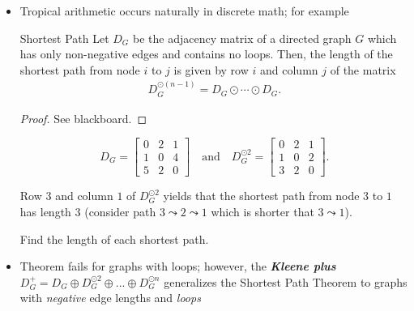 \documentclass{article}
\begin{document}
\begin{itemize}
	 \item Tropical arithmetic occurs naturally in discrete math; for example

		\begin{theorem*}{Shortest Path \cite[Prop. 7.9]{inv2nonlinearalgebra}}{}
			Let \( D_G  \) be the adjacency matrix of a directed graph \( G \) which has only non-negative edges and contains no loops.
			Then, the length of the shortest path from node \( i \) to \( j \) is given by row \( i \) and column \( j \) of the matrix 
			\begin{align*}
				D_G^{\odot(n-1)} = D_G \odot \cdots \odot D_G.
			\end{align*}
		\end{theorem*}

		\begin{proof}
			See blackboard.
		\end{proof}
		
		\begin{example*}{}{}
			\begin{figure}[H]
				\centering
				
			\end{figure}
			$$
				D_G = \begin{bmatrix}
					0 & 2 & 1 \\
					1 & 0 & 4 \\
					5 & 2 & 0
				\end{bmatrix} \quad \text{and} \quad D_G^{\odot 2} = \begin{bmatrix}
					0 & 2 &1 \\ 1 & 0 & 2 \\ 3 & 2 & 0
				\end{bmatrix}.
			$$

			Row \( 3 \) and column \( 1 \) of \(  D_G^{\odot 2} \) yields that the shortest path from node \( 3 \) to \( 1 \) has length \( 3 \) (consider path \( 3 \leadsto 2 \leadsto 1 \) which is shorter that \( 3 \leadsto 1 \)). 
		\end{example*}

		\begin{exercise}{Find the length of each shortest path.}{}
			\begin{figure}[H]
				\centering
				
			\end{figure}
		\end{exercise}

		\item Theorem fails for graphs with loops; however, the \textbf{\textit{Kleene plus}} \( 	D_G^+ = D_G \oplus D_G^{\odot 2} \oplus ... \oplus D_G^{\odot n} \) generalizes the Shortest Path Theorem to graphs with \emph{negative} edge lengths and \emph{loops} \cite[Exercise 1.9 (5)]{MaclaganSturmfels}
	\end{itemize}
 	
\end{document}
